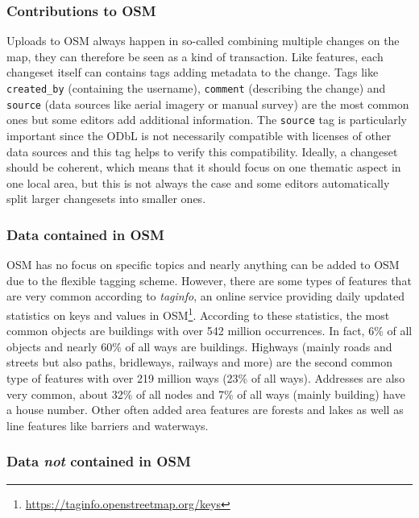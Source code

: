 		\subsubsection{Contributions to OSM}
		
			Uploads to OSM always happen in so-called  combining multiple changes on the map\cite{osm-wiki-changeset}, they can therefore be seen as a kind of transaction.
			Like features, each changeset itself can contains tags adding metadata to the change.
			Tags like \texttt{created\_by} (containing the username), \texttt{comment} (describing the change) and \texttt{source} (data sources like aerial imagery or manual survey) are the most common ones but some editors add additional information.
			The \texttt{source} tag is particularly important since the ODbL is not necessarily compatible with licenses of other data sources and this tag helps to verify this compatibility.
			Ideally, a changeset should be coherent, which means that it should focus on one thematic aspect in one local area, but this is not always the case and some editors automatically split larger changesets into smaller ones.
			
		\subsubsection{Data contained in OSM}
		
			OSM has no focus on specific topics and nearly anything can be added to OSM due to the flexible tagging scheme.
			However, there are some types of features that are very common according to \emph{taginfo}, an online service providing daily updated statistics on keys and values in OSM\footnote{\url{https://taginfo.openstreetmap.org/keys}}.
			According to these statistics, the most common objects are buildings with over 542 million occurrences.
			In fact, 6\% of all objects and nearly 60\% of all ways are buildings.
			Highways (mainly roads and streets but also paths, bridleways, railways and more) are the second common type of features with over 219 million ways (23\% of all ways).
			Addresses are also very common, about 32\% of all nodes and 7\% of all ways (mainly building) have a house number.
			Other often added area features are forests and lakes as well as line features like barriers and waterways.
			
		\subsubsection{Data \textit{not} contained in OSM}
		\label{subsubsec:data-not-in-osm}
		
